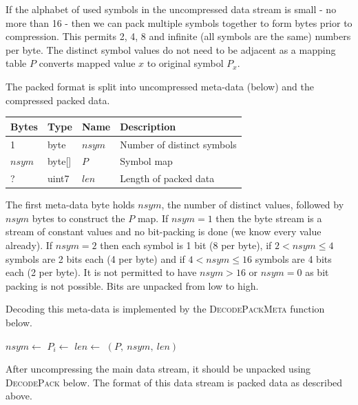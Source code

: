 \documentclass[a4paper]{article}
\begin{document}
If the alphabet of used symbols in the uncompressed data stream is
small - no more than 16 - then we can pack multiple symbols together
to form bytes prior to compression.  This permits 2, 4, 8 and infinite
(all symbols are the same) numbers per byte.  The distinct
symbol values do not need to be adjacent as a mapping table $P$
converts mapped value $x$ to original symbol $P_x$.

The packed format is split into uncompressed meta-data (below) and the compressed packed data.

\begin{table}[h]
\centering
\begin{tabular}{lllp{9cm}}
\textbf{Bytes} & \textbf{Type} & \textbf{Name} & \textbf{Description}\\
\hline
1      & byte   & $nsym$ & Number of distinct symbols\\
$nsym$ & byte[] & $P$    & Symbol map \\
?      & uint7  & $len$  & Length of packed data
\end{tabular}
\end{table}

The first meta-data byte holds $nsym$, the number of distinct values, followed
by $nsym$ bytes to construct the $P$ map.  If $nsym = 1$ then the byte
stream is a stream of constant values and no bit-packing is done (we
know every value already).  If $nsym = 2$ then each symbol is 1 bit (8
per byte), if $2 < nsym \le 4$ symbols are 2 bits each (4 per byte)
and if $4 < nsym \le 16$ symbols are 4 bits each (2 per byte). It is
not permitted to have $nsym > 16$ or $nsym = 0$ as bit packing is not
possible. Bits are unpacked from low to high.

Decoding this meta-data is implemented by the \textsc{DecodePackMeta}
function below.

\begin{algorithmic}[1]
  \State $nsym \gets $
    \State $P_i \gets $ 
  \EndFor
  \State $len \gets $ 
  \State \Return $(P,\ nsym, \ len)$
\EndFunction
\end{algorithmic}

After uncompressing the main data stream, it should be unpacked using
\textsc{DecodePack} below.  The format of this data stream is packed
data as described above.
\end{document}
